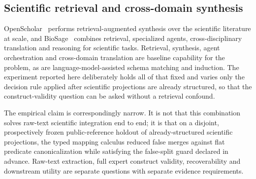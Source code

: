 \subsection{Scientific retrieval and cross-domain synthesis}

OpenScholar~\cite{openScholar2024} performs retrieval-augmented synthesis
over the scientific literature at scale, and BioSage~\cite{biosage2025} combines
retrieval, specialized agents, cross-disciplinary translation and reasoning
for scientific tasks. Retrieval, synthesis, agent orchestration and
cross-domain translation are baseline capability for the problem, as are
language-model-assisted schema matching and induction. The experiment reported
here deliberately holds all of that fixed and varies only the decision rule
applied after scientific projections are already structured, so that the
construct-validity question can be asked without a retrieval confound.

The empirical claim is correspondingly narrow. It is not that this combination
solves raw-text scientific integration end to end; it is that on a disjoint,
prospectively frozen public-reference holdout of already-structured scientific
projections, the typed mapping calculus reduced false merges against flat
predicate canonicalization while satisfying the false-split guard declared in
advance. Raw-text extraction, full expert construct validity, recoverability
and downstream utility are separate questions with separate evidence
requirements.
\endinput
